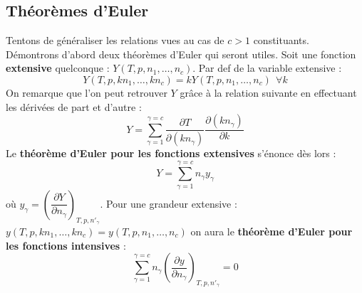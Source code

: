 \documentclass[11pt, a4paper, openany]{book}
\begin{document}
\subsection{Théorèmes d'Euler}
Tentons de généraliser les relations vues au cas de $c > 1$ constituants. Démontrons d'abord deux théorèmes d'Euler qui seront utiles. Soit  une fonction \textbf{extensive} quelconque : $Y(T, p, n_1, \dots, n_c)$. Par def de la variable extensive :
\begin{equation}
Y(T, p, kn_1, \dots, kn_c) = kY(T, p, n_1, \dots, n_c)\ \ \forall k
\end{equation}
On remarque que l'on peut retrouver $Y$ grâce à la relation suivante en effectuant les dérivées de part et d'autre :
\begin{equation}
Y = \sum_{\gamma = 1}^{\gamma = c} \frac{\partial T}{\partial (kn_\gamma)}\frac{\partial (kn_\gamma)}{\partial k}
\end{equation}
Le \textbf{théorème d'Euler pour les fonctions extensives} s'énonce dès lors :
\begin{equation}
Y = \sum _{\gamma = 1}^{\gamma = c} n_\gamma y_\gamma
\end{equation}
où $y_\gamma = \left(\dfrac{\partial Y}{\partial n_\gamma}\right)_{T,p,n'_\gamma}$. Pour une grandeur extensive : $y(T, p, kn_1,\dots, kn_c) = y(T, p,n_1,\dots, n_c)$ on aura le \textbf{théorème d'Euler pour les fonctions intensives} :
\begin{equation}
\sum_{\gamma = 1}^{\gamma = c} n_\gamma\left(\dfrac{\partial y}{\partial n_\gamma}\right)_{T, p, n'_\gamma} = 0
\end{equation}
\end{document}

